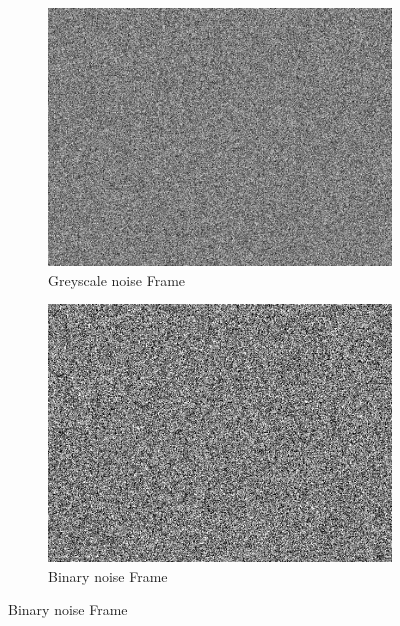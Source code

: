 \documentclass[11pt,a4paper]{article}
\begin{document}
\begin{figure}
	\vspace{1em}
	
	\begin{subfigure}[t]{0.35\textwidth}
	\includegraphics[width=1\textwidth]{greynoise.png}
	\caption{Greyscale noise Frame}
	\end{subfigure}
	\hspace{1em}
	\begin{subfigure}[t]{0.35\textwidth}
	\includegraphics[width=1\textwidth]{binarynoise.png}
	\caption{Binary noise Frame}
	\end{subfigure}
	
	\vspace{1em}
	

\end{figure}
\end{document}
